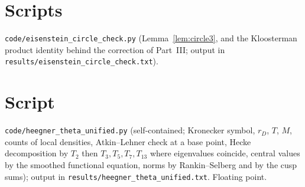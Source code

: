 \documentclass[11pt]{amsart}
\theoremstyle{remark}
\begin{document}
\section*{Scripts}
\texttt{code/eisenstein\_circle\_check.py} (Lemma~\ref{lem:circle3}, and the Kloosterman product identity behind the correction of Part~III; output in \texttt{results/eisenstein\_circle\_check.txt}).

\section*{Script}
\texttt{code/heegner\_theta\_unified.py} (self-contained; Kronecker symbol, $r_D$, $T$, $M$, counts of local densities, Atkin--Lehner check at a base point, Hecke decomposition by $T_2$ then $T_3,T_5,T_7,T_{13}$ where eigenvalues coincide, central values by the smoothed functional equation, norms by Rankin--Selberg and by the cusp sums); output in \texttt{results/heegner\_theta\_unified.txt}. Floating point.
\end{document}

